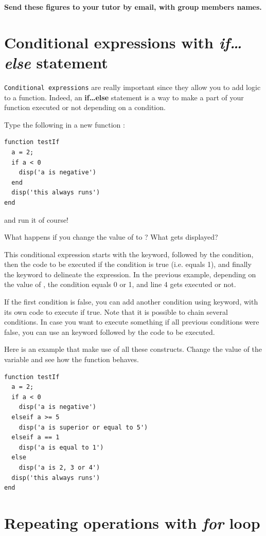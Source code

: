 \documentclass{article}
\begin{document}
\textbf{Send these figures to your tutor by email, with group members names.}


\section{Conditional expressions with \emph{if\dots else} statement}

\verb|Conditional expressions| are really important since they allow you to add logic to a function.
Indeed, an \textbf{if\dots else} statement is a way to make a part of your function executed or not depending on a condition.

Type the following in a new function :
\begin{lstlisting}
function testIf
  a = 2;
  if a < 0
    disp('a is negative')
  end
  disp('this always runs')
end
\end{lstlisting}
and run it of course!

What happens if you change the value of  to ?
What gets displayed?

This conditional expression starts with the  keyword, followed by the condition, then the code to be executed if the condition is true (i.e. equals 1), and finally the  keyword to delineate the expression.
In the previous example, depending on the value of , the condition  equals 0 or 1, and line 4 gets executed or not.

If the first condition is false, you can add another condition using  keyword, with its own code to execute if true.
Note that it is possible to chain several  conditions.
In case you want to execute something if all previous conditions were false, you can use an  keyword followed by the code to be executed.

Here is an example that make use of all these constructs.
Change the value of the variable  and see how the function behaves.
\begin{lstlisting}
function testIf
  a = 2;
  if a < 0
    disp('a is negative')
  elseif a >= 5
    disp('a is superior or equal to 5')
  elseif a == 1
    disp('a is equal to 1')
  else
    disp('a is 2, 3 or 4')
  disp('this always runs')
end
\end{lstlisting}


\section{Repeating operations with \emph{for} loop}
\end{document}
